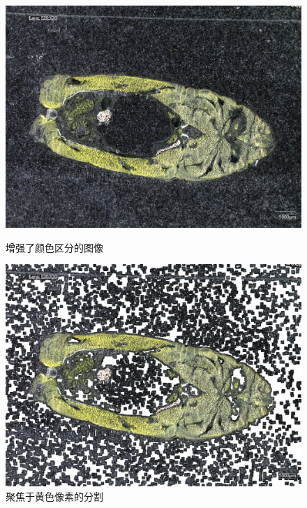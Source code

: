 \begin{figure}[H]
    \centering
    \begin{minipage}{0.40\textwidth}
        \centering
        \includegraphics[width=\textwidth]{./fig/threshold/enhanced_image.jpg}
        \caption{增强了颜色区分的图像}
        \label{fig:enhanced_image}
    \end{minipage}
    \begin{minipage}{0.4\textwidth}
        \centering
        \includegraphics[width=\textwidth]{./fig/threshold/yellowpic.jpg}
        \caption{聚焦于黄色像素的分割}
        \label{fig:yellowpic}
    \end{minipage}
\end{figure}

